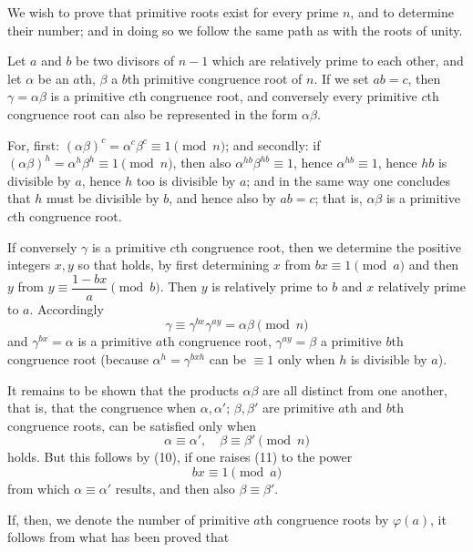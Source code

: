 
We wish to prove that primitive roots exist for every prime $n$, and to
determine their number; and in doing so we follow the same path as with
the roots of unity.

Let $a$ and $b$ be two divisors of $n-1$ which are relatively prime
to each other, and let $\alpha$ be an $a$th, $\beta$ a $b$th
primitive congruence root of $n$. If we set $ab=c$, then
$\gamma=\alpha\beta$ is a primitive $c$th congruence root, and
conversely every primitive $c$th congruence root can also be represented
in the form $\alpha\beta$.

For, first: $(\alpha\beta)^c = \alpha^c\beta^c \equiv 1 \pmod{n}$;
and secondly: if $(\alpha\beta)^h = \alpha^h\beta^h \equiv 1 \pmod{n}$,
then also $\alpha^{hb}\beta^{hb}\equiv 1$, hence $\alpha^{hb}\equiv 1$,
hence $hb$ is divisible by $a$, hence $h$ too is divisible by $a$; and in
the same way one concludes that $h$ must be divisible by $b$, and hence
also by $ab=c$; that is, $\alpha\beta$ is a primitive $c$th
congruence root.

If conversely $\gamma$ is a primitive $c$th congruence root, then we
determine the positive integers $x, y$ so that
holds, by first determining $x$ from $bx \equiv 1 \pmod{a}$ and then $y$ from
$y \equiv \dfrac{1-bx}{a} \pmod{b}$. Then $y$ is relatively prime
to $b$ and $x$ relatively prime to $a$. Accordingly
\[
\gamma \equiv \gamma^{bx}\gamma^{ay} = \alpha\beta \pmod{n}
\]
and $\gamma^{bx} = \alpha$ is a primitive $a$th
congruence root, $\gamma^{ay} = \beta$ a primitive $b$th
congruence root (because $\alpha^h = \gamma^{bxh}$ can be $\equiv 1$
only when $h$ is divisible by $a$).

It remains to be shown that the products $\alpha\beta$ are all distinct
from one another, that is, that the congruence
when $\alpha, \alpha'$; $\beta, \beta'$ are primitive $a$th and
$b$th congruence roots, can be satisfied only when
\[
\alpha \equiv \alpha', \quad \beta \equiv \beta' \pmod{n}
\]
holds. But this follows by (10), if one raises (11) to the power
\[
bx \equiv 1 \pmod{a}
\]
from which $\alpha \equiv \alpha'$ results, and then also
$\beta \equiv \beta'$.

If, then, we denote the number of primitive $a$th
congruence roots by $\varphi(a)$, it follows from what has been proved that
